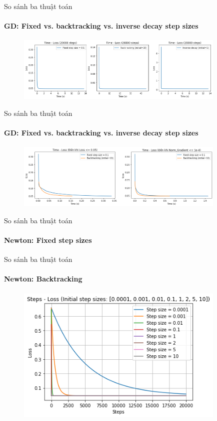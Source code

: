 \documentclass[10pt]{beamer}
\theoremstyle{remark}
\theoremstyle{definition}
\begin{document}
\begin{frame}{So sánh ba thuật toán}
	\framesubtitle{GD: Fixed vs. backtracking vs. inverse decay step sizes}

	\begin{figure}
		\centering
		\includegraphics[width=10cm]{Thinh/10.png}
	\end{figure}

\end{frame}
\begin{frame}{So sánh ba thuật toán}
	\framesubtitle{GD: Fixed vs. backtracking vs. inverse decay step sizes}

	\begin{figure}
		\centering
		\includegraphics[width=10cm]{Thinh/11.png}
	\end{figure}
\end{frame}

\begin{frame}{So sánh ba thuật toán}
	\framesubtitle{Newton: Fixed step sizes}

\end{frame}

\begin{frame}{So sánh ba thuật toán}
	\framesubtitle{Newton: Backtracking}
	\begin{figure}
		\centering
		\includegraphics[width=10cm]{Thinh/12.png}
	\end{figure}

\end{frame}
\end{document}
